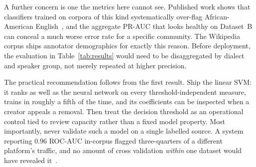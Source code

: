 A further concern is one the metrics here cannot see. Published work shows that classifiers
trained on corpora of this kind systematically over-flag African-American
English~\cite{sap2019risk, blodgett2016demographic}, and the aggregate PR-AUC that looks
healthy on Dataset~B can conceal a much worse error rate for a specific community. The
Wikipedia corpus ships annotator demographics for exactly this reason. Before deployment,
the evaluation in Table~\ref{tab:results} would need to be disaggregated by dialect and
speaker group, not merely repeated at higher precision.

The practical recommendation follows from the first result. Ship the linear SVM: it ranks
as well as the neural network on every threshold-independent measure, trains in roughly a
fifth of the time, and its coefficients can be inspected when a creator appeals a removal.
Then treat the decision threshold as an operational control tied to review capacity rather
than a fixed model property. Most importantly, never validate such a model on a single
labelled source. A system reporting 0.96 ROC-AUC in-corpus flagged three-quarters of a
different platform's traffic, and no amount of cross validation \emph{within} one dataset
would have revealed it~\cite{vidgen2020directions}.
